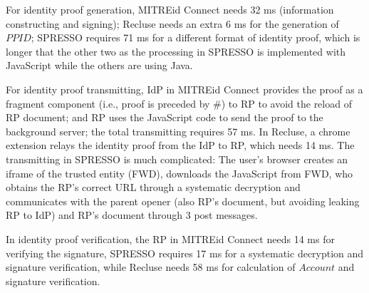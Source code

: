For identity proof generation, MITREid Connect needs 32 ms (information constructing and signing); Recluse needs an extra 6 ms for the generation of $PPID$;  SPRESSO requires 71 ms for a different format of identity proof, which is longer that the other two as the processing in SPRESSO is implemented with JavaScript while the others are using Java.

For identity proof transmitting, IdP in  MITREid Connect provides the proof as a fragment component (i.e., proof is preceded by \#) to RP to avoid the reload of RP document; and RP uses the JavaScript code to send the proof to the background server; the total transmitting requires 57 ms. In Recluse, a chrome extension relays the identity proof from the IdP to RP, which needs 14 ms. The transmitting in SPRESSO is much complicated: The user's browser creates an iframe of the trusted entity (FWD), downloads the JavaScript from FWD, who obtains the RP's correct URL through a systematic decryption and communicates with the parent opener (also RP's document, but avoiding leaking RP to IdP) and RP's document through 3 post messages. 

In identity proof verification, the RP in MITREid Connect needs 14 ms for verifying the signature, SPRESSO requires 17 ms for a systematic decryption and signature verification, while Recluse needs 58 ms for calculation of $Account$ and signature verification.

